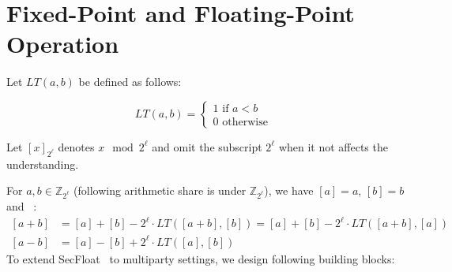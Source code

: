 \chapter{Fixed-Point and Floating-Point Operation}
\label{cha:FpFl}

Let $LT\left(a,b\right) $ be defined as follows:

\begin{equation}
    LT\left(a,b\right)=
    \begin{cases}
        1 \text{ if } a <b \\
        0 \text{ otherwise }
    \end{cases}
\end{equation}

Let $\left[x\right] _{2^{\ell}}$ denotes $x \mod 2^{\ell}$ and omit the subscript $2^{\ell}$ when it not affects the understanding.

For $a, b \in \mathbb{Z}_{2^{\ell}}$ (following arithmetic share is under $\mathbb{Z}_{2^{\ell}}$), we have $\left[a\right]=a $, $\left[b\right]=b $ and ~\cite{cryptoeprint:2021:119}:
\begin{equation}
    \label{eq:LT}
    \begin{split}
        \left[a +b\right]  &=\left[a\right]  + \left[b\right] -2^{\ell} \cdot LT\left(\left[a+b\right] ,\left[b\right] \right)   = \left[a\right] +\left[b\right]  -2^{\ell} \cdot LT\left(\left[a+b\right]  ,\left[a\right] \right) \\
        \left[ a -b\right]  &=\left[a\right]  -\left[ b\right]  +2^{\ell} \cdot LT\left(\left[a\right] ,\left[b\right] \right)
    \end{split}
\end{equation}
To extend SecFloat~\cite{cryptoeprint:2022:322} to multiparty settings, we design following building blocks:

